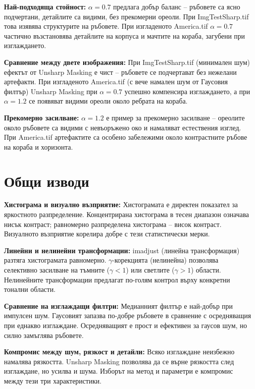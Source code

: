 \textbf{Най-подходяща стойност:} $\alpha = 0.7$ предлага добър баланс – ръбовете са ясно подчертани, детайлите са видими, без прекомерни ореоли. При ImgTestSharp.tif това изявява структурите на ръбовете. При изгладеното America.tif $\alpha = 0.7$ частично възстановява детайлите на корпуса и мачтите на кораба, загубени при изглаждането.

\textbf{Сравнение между двете изображения:} При ImgTestSharp.tif (минимален шум) ефектът от Unsharp Masking е чист – ръбовете се подчертават без нежелани артефакти. При изгладеното America.tif (с вече намален шум от Гаусовия филтър) Unsharp Masking при $\alpha = 0.7$ успешно компенсира изглаждането, а при $\alpha = 1.2$ се появяват видими ореоли около ребрата на кораба.

\textbf{Прекомерно засилване:} $\alpha = 1.2$ е пример за прекомерно засилване – ореолите около ръбовете са видими с невъоръжено око и намаляват естествения изглед. При America.tif артефактите са особено забележими около контрастните ръбове на кораба и хоризонта.

\section{Общи изводи}

\textbf{Хистограма и визуално възприятие:} Хистограмата е директен показател за яркостното разпределение. Концентрирана хистограма в тесен диапазон означава нисък контраст; равномерно разпределена хистограма – висок контраст. Визуалното възприятие корелира добре с тези статистически мерки.

\textbf{Линейни и нелинейни трансформации:} imadjust (линейна трансформация) разтяга хистограмата равномерно. $\gamma$-корекцията (нелинейна) позволява селективно засилване на тъмните ($\gamma < 1$) или светлите ($\gamma > 1$) области. Нелинейните трансформации предлагат по-голям контрол върху конкретни тонални области.

\textbf{Сравнение на изглаждащи филтри:} Медианният филтър е най-добър при импулсен шум. Гаусовият запазва по-добре ръбовете в сравнение с осредняващия при еднакво изглаждане. Осредняващият е прост и ефективен за гаусов шум, но силно замъглява ръбовете.

\textbf{Компромис между шум, рязкост и детайли:} Всяко изглаждане неизбежно намалява рязкостта. Unsharp Masking позволява да се върне рязкостта след изглаждане, но усилва и шума. Изборът на метод и параметри е компромис между тези три характеристики.

